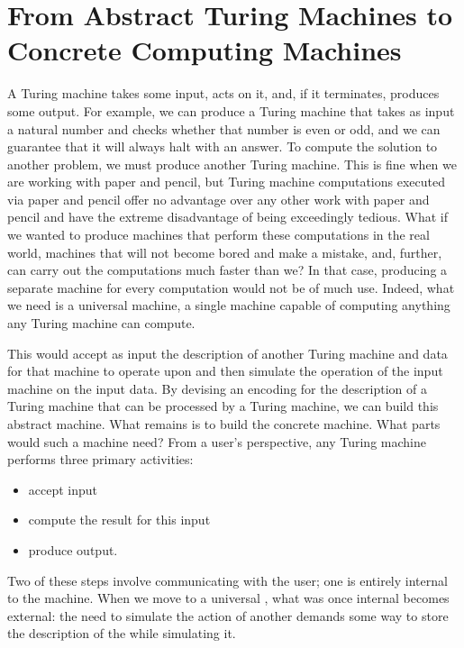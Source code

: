 \label{background:computers}
\section{From Abstract Turing Machines to Concrete Computing Machines}
A Turing machine takes some input, acts on it, and, if it terminates, produces some output. For example, we can produce a Turing machine that takes as input a natural number and checks whether that number is even or odd, and we can guarantee that it will always halt with an answer. To compute the solution to another problem, we must produce another Turing machine. This is fine when we are working with paper and pencil, but Turing machine computations executed via paper and pencil offer no advantage over any other work with paper and pencil and have the extreme disadvantage of being exceedingly tedious. What if we wanted to produce machines that perform these computations in the real world, machines that will not become bored and make a mistake, and, further, can carry out the computations much faster than we? In that case, producing a separate machine for every computation would not be of much use. Indeed, what we need is a universal machine, a single machine capable of computing anything any Turing machine can compute.

This  would accept as input the description of another Turing machine and data for that machine to operate upon and then simulate the operation of the input machine on the input data. By devising an encoding for the description of a Turing machine that can be processed by a Turing machine, we can build this abstract machine. What remains is to build the concrete machine. What parts would such a machine need? From a user's perspective, any Turing machine performs three primary activities:
\begin{itemize}
\item accept input
\item compute the result for this input
\item produce output.
\end{itemize}
Two of these steps involve communicating with the user; one is entirely internal to the machine. When we move to a universal \TM, what was once internal becomes external: the need to simulate the action of another \TM demands some way to store the description of the \TM while simulating it.

